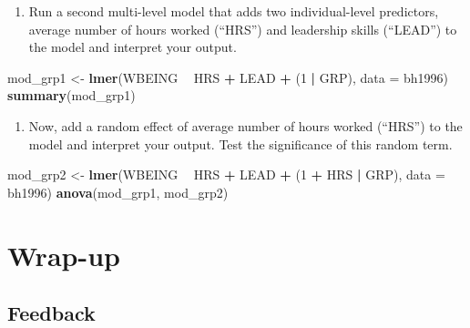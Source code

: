 \documentclass[]{book}
\newenvironment{Shaded}{\begin{snugshade}}{\end{snugshade}}
\newcommand{\KeywordTok}[1]{\textcolor[rgb]{0.13,0.29,0.53}{\textbf{#1}}}
\newcommand{\DataTypeTok}[1]{\textcolor[rgb]{0.13,0.29,0.53}{#1}}
\newcommand{\DecValTok}[1]{\textcolor[rgb]{0.00,0.00,0.81}{#1}}
\newcommand{\StringTok}[1]{\textcolor[rgb]{0.31,0.60,0.02}{#1}}
\newcommand{\OperatorTok}[1]{\textcolor[rgb]{0.81,0.36,0.00}{\textbf{#1}}}
\newcommand{\NormalTok}[1]{#1}
\providecommand{\tightlist}{%
  \setlength{\itemsep}{0pt}\setlength{\parskip}{0pt}}
\begin{document}
\begin{enumerate}
\def\labelenumi{\arabic{enumi}.}
\setcounter{enumi}{2}
\tightlist
\item
  Run a second multi-level model that adds two individual-level
  predictors, average number of hours worked (``HRS'') and leadership
  skills (``LEAD'') to the model and interpret your output.
\end{enumerate}

\begin{Shaded}
\begin{Highlighting}[]
\NormalTok{  mod_grp1 <-}\StringTok{ }\KeywordTok{lmer}\NormalTok{(WBEING }\OperatorTok{~}\StringTok{ }\NormalTok{HRS }\OperatorTok{+}\StringTok{ }\NormalTok{LEAD }\OperatorTok{+}\StringTok{ }\NormalTok{(}\DecValTok{1} \OperatorTok{|}\StringTok{ }\NormalTok{GRP), }\DataTypeTok{data =}\NormalTok{ bh1996)}
  \KeywordTok{summary}\NormalTok{(mod_grp1)}
\end{Highlighting}
\end{Shaded}

\begin{enumerate}
\def\labelenumi{\arabic{enumi}.}
\setcounter{enumi}{2}
\tightlist
\item
  Now, add a random effect of average number of hours worked (``HRS'')
  to the model and interpret your output. Test the significance of this
  random term.
\end{enumerate}

\begin{Shaded}
\begin{Highlighting}[]
\NormalTok{  mod_grp2 <-}\StringTok{ }\KeywordTok{lmer}\NormalTok{(WBEING }\OperatorTok{~}\StringTok{ }\NormalTok{HRS }\OperatorTok{+}\StringTok{ }\NormalTok{LEAD }\OperatorTok{+}\StringTok{ }\NormalTok{(}\DecValTok{1} \OperatorTok{+}\StringTok{ }\NormalTok{HRS }\OperatorTok{|}\StringTok{ }\NormalTok{GRP), }\DataTypeTok{data =}\NormalTok{ bh1996)}
  \KeywordTok{anova}\NormalTok{(mod_grp1, mod_grp2)}
\end{Highlighting}
\end{Shaded}

\section{Wrap-up}\label{wrap-up-2}

\subsection{Feedback}\label{feedback-2}
\end{document}
